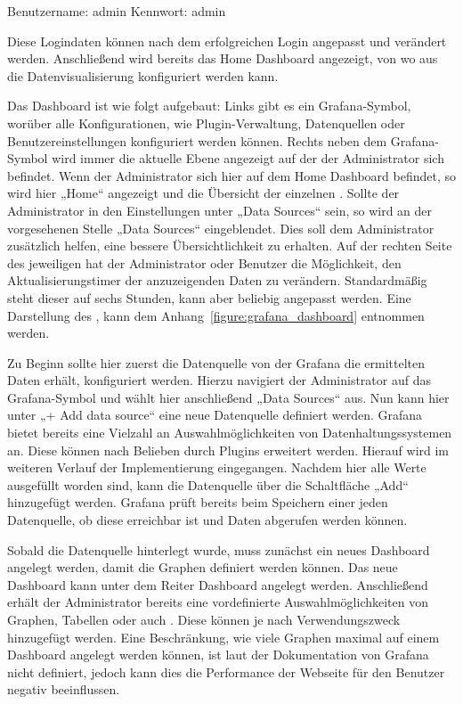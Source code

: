 \begin{outline}
  \1 Benutzername: admin
  \1 Kennwort: admin
\end{outline}

Diese Logindaten können nach dem erfolgreichen Login angepasst und verändert
werden. Anschließend wird bereits das Home \gls{Dashboard} angezeigt, von wo
aus die Datenvisualisierung konfiguriert werden kann.

Das \gls{Dashboard} ist wie folgt aufgebaut: Links gibt es ein
Grafana\hyp{}Symbol, worüber alle Konfigurationen, wie Plugin\hyp{}Verwaltung,
Datenquellen oder Benutzereinstellungen konfiguriert werden können. Rechts
neben dem Grafana\hyp{}Symbol wird immer die aktuelle Ebene angezeigt auf der
der Administrator sich befindet. Wenn der Administrator sich hier auf dem Home
\gls{Dashboard} befindet, so wird hier „Home“ angezeigt und die Übersicht der
einzelnen . Sollte der Administrator in den
Einstellungen unter „Data Sources“ sein, so wird an der vorgesehenen Stelle
„Data Sources“ eingeblendet. Dies soll dem Administrator zusätzlich helfen,
eine bessere Übersichtlichkeit zu erhalten. Auf der rechten Seite des
jeweiligen  hat der Administrator oder Benutzer
die Möglichkeit, den Aktualisierungstimer der anzuzeigenden Daten zu verändern.
Standardmäßig steht dieser auf sechs Stunden, kann aber beliebig angepasst
werden. Eine Darstellung des , kann dem
Anhang~\ref{figure:grafana_dashboard} entnommen werden.

Zu Beginn sollte hier zuerst die Datenquelle von der Grafana die ermittelten
Daten erhält, konfiguriert werden. Hierzu navigiert der Administrator auf das
Grafana\hyp{}Symbol und wählt hier anschließend „Data Sources“ aus. Nun kann
hier unter „+ Add data source“ eine neue Datenquelle definiert werden. Grafana
bietet bereits eine Vielzahl an Auswahlmöglichkeiten von Datenhaltungssystemen
an. Diese können nach Belieben durch Plugins erweitert werden. Hierauf wird im
weiteren Verlauf der Implementierung eingegangen. Nachdem hier alle Werte
ausgefüllt worden sind, kann die Datenquelle über die Schaltfläche „Add“
hinzugefügt werden. Grafana prüft bereits beim Speichern einer jeden
Datenquelle, ob diese erreichbar ist und Daten abgerufen werden können.

Sobald die Datenquelle hinterlegt wurde, muss zunächst ein neues
\gls{Dashboard} angelegt werden, damit die Graphen definiert werden können. Das
neue \gls{Dashboard} kann unter dem Reiter \gls{Dashboard} angelegt werden.
Anschließend erhält der Administrator bereits eine vordefinierte
Auswahlmöglichkeiten von Graphen, Tabellen oder auch
. Diese können je nach Verwendungszweck
hinzugefügt werden. Eine Beschränkung, wie viele Graphen maximal auf einem
\gls{Dashboard} angelegt werden können, ist laut der Dokumentation von Grafana
nicht definiert, jedoch kann dies die Performance der Webseite für den Benutzer
negativ beeinflussen.

